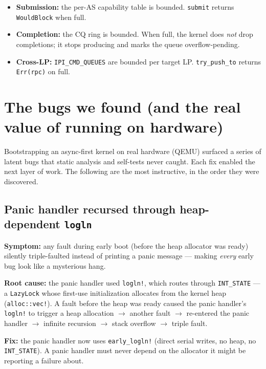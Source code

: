 \begin{itemize}
    \item \textbf{Submission:} the per-AS capability table is bounded.
        \texttt{submit} returns \texttt{WouldBlock} when full.
    \item \textbf{Completion:} the CQ ring is bounded. When full, the kernel
        does \emph{not} drop completions; it stops producing and marks the
        queue overflow-pending.
    \item \textbf{Cross-LP:} \texttt{IPI\_CMD\_QUEUES} are bounded per target
        LP. \texttt{try\_push\_to} returns \texttt{Err(rpc)} on full.
\end{itemize}

\section{The bugs we found (and the real value of running on hardware)}

Bootstrapping an async-first kernel on real hardware (QEMU) surfaced a series
of latent bugs that static analysis and self-tests never caught. Each fix
enabled the next layer of work. The following are the most instructive, in the
order they were discovered.

\subsection{Panic handler recursed through heap-dependent \texttt{logln}}

\textbf{Symptom:} any fault during early boot (before the heap allocator was
ready) silently triple-faulted instead of printing a panic message --- making
\emph{every} early bug look like a mysterious hang.

\textbf{Root cause:} the panic handler used \texttt{logln!}, which routes
through \texttt{INT\_STATE} --- a \texttt{LazyLock} whose first-use
initialization allocates from the kernel heap (\texttt{alloc::vec!}). A fault
before the heap was ready caused the panic handler's \texttt{logln!} to trigger
a heap allocation $\rightarrow$ another fault $\rightarrow$ re-entered the
panic handler $\rightarrow$ infinite recursion $\rightarrow$ stack overflow
$\rightarrow$ triple fault.

\textbf{Fix:} the panic handler now uses \texttt{early\_logln!} (direct serial
writes, no heap, no \texttt{INT\_STATE}). A panic handler must never depend on
the allocator it might be reporting a failure about.

